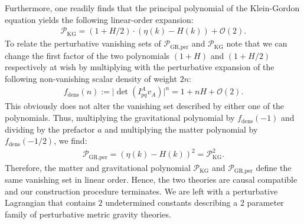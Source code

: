 Furthermore, one readily finds that the principal polynomial of the Klein-Gordon equation yields the following linear-order expansion:
\begin{align}
    \mathcal{P}_{\text{KG}} = (1 + H/2) \cdot (\eta(k) - H(k)) + \mathcal{O}(2) .
\end{align}
To relate the perturbative vanishing sets of $\mathcal{P}_{\text{GR,per}}$ and $\mathcal{P}_{\text{KG}}$ note that we can change the first factor of the two polynomials $(1+H)$ and $(1+H/2)$ respectively at wish by multiplying with the perturbative expansion of the following non-vanishing scalar density of weight $2n$:
\begin{align}
    f_{\text{dens}}(n) := \vert \operatorname{det}\left (I^A_{pq}v_A \right )\vert ^n = 1 + nH + \mathcal{O}(2).
\end{align}
This obviously does not alter the vanishing set described by either one of the polynomials. Thus, multiplying the gravitational polynomial by $f_{\text{dens}}(-1)$ and dividing by the prefactor $a$ and multiplying the matter polynomial by $f_{\text{dens}}(-1/2)$, we find:
\begin{align}
    \mathcal{P}_{\text{GR,per}} = (\eta(k)-H(k))^2 = \mathcal{P}_{\text{KG}}^2.
\end{align}
Therefore, the matter and gravitational polynomial $\mathcal{P}_{\text{KG}}$ and $\mathcal{P}_{\text{GR,per}}$ define the same vanishing set in linear order.
Hence, the two theories are causal compatible and our construction procedure terminates. We are left with a perturbative Lagrangian that contains $2$ undetermined constants describing a $2$ parameter family of perturbative metric gravity theories.  

